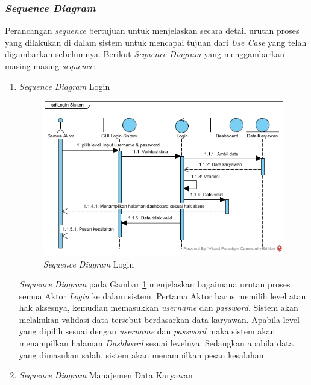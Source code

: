 			\subsubsection{\emph{Sequence Diagram}}
			Perancangan \emph{sequence} bertujuan untuk menjelaskan secara detail urutan proses yang dilakukan di dalam sistem untuk mencapai tujuan dari \emph{Use Case} yang telah digambarkan sebelumnya. Berikut \emph{Sequence Diagram} yang menggambarkan masing-masing \emph{sequence}:
			\newpage
			\begin{enumerate}
			    \itemsep0em
			    \item \emph{Sequence Diagram} Login
			        \begin{figure}[H]
            		    \centering
            		    \includegraphics[width=13cm]{gambar/sequence/seq-login}
            		    \caption{\emph{Sequence Diagram} Login}
            		    \label{sequence_login}
            		\end{figure}
            		\emph{Sequence Diagram} pada Gambar \ref{sequence_login} menjelaskan bagaimana urutan proses semua Aktor \emph{Login} ke dalam sistem. Pertama Aktor harus memilih level atau hak aksesnya, kemudian memasukkan \emph{username} dan \emph{password}. Sistem akan melakukan validasi data tersebut berdasarkan data karyawan. Apabila level yang dipilih sesuai dengan \emph{username} dan \emph{password} maka sistem akan menampilkan halaman \emph{Dashboard} sesuai levelnya. Sedangkan apabila data yang dimasukan salah, sistem akan menampilkan pesan kesalahan. \newpage
			    \item \emph{Sequence Diagram} Manajemen Data Karyawan
			        \begin{figure}[H]
            		    \centering

\end{figure}
\end{enumerate}

